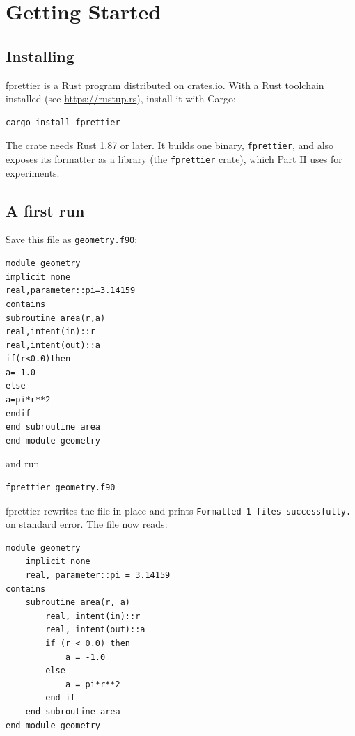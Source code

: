\documentclass[11pt,a4paper,openany]{book}
\newcommand{\code}[1]{\texttt{\small #1}}
\newcommand{\file}[1]{\texttt{\small\color{accent}#1}}
\begin{document}
\chapter{Getting Started}\label{ch:start}

\section{Installing}

fprettier is a Rust program distributed on crates.io. With a Rust toolchain
installed (see \url{https://rustup.rs}), install it with Cargo:

\begin{lstlisting}[style=shell]
cargo install fprettier
\end{lstlisting}

The crate needs Rust 1.87 or later. It builds one binary, \code{fprettier}, and
also exposes its formatter as a library (the \code{fprettier} crate), which
Part II uses for experiments.

\section{A first run}

Save this file as \file{geometry.f90}:

\begin{lstlisting}[style=before]
module geometry
implicit none
real,parameter::pi=3.14159
contains
subroutine area(r,a)
real,intent(in)::r
real,intent(out)::a
if(r<0.0)then
a=-1.0
else
a=pi*r**2
endif
end subroutine area
end module geometry
\end{lstlisting}

and run

\begin{lstlisting}[style=shell]
fprettier geometry.f90
\end{lstlisting}

fprettier rewrites the file in place and prints \code{Formatted 1 files
successfully.} on standard error. The file now reads:

\begin{lstlisting}[style=after]
module geometry
    implicit none
    real, parameter::pi = 3.14159
contains
    subroutine area(r, a)
        real, intent(in)::r
        real, intent(out)::a
        if (r < 0.0) then
            a = -1.0
        else
            a = pi*r**2
        end if
    end subroutine area
end module geometry
\end{lstlisting}
\end{document}
